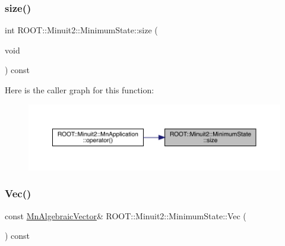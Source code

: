 \mbox{\label{classROOT_1_1Minuit2_1_1MinimumState_af680928a4485a4d0db0c81a8283d24bd}} 
\subsubsection{\texorpdfstring{size()}{size()}\hspace{0.1cm}{\footnotesize\ttfamily [2/2]}}
{\footnotesize\ttfamily int R\+O\+O\+T\+::\+Minuit2\+::\+Minimum\+State\+::size (\begin{DoxyParamCaption}\item[{void}]{ }\end{DoxyParamCaption}) const\hspace{0.3cm}{\ttfamily [inline]}}

Here is the caller graph for this function\+:\nopagebreak
\begin{figure}[H]
\begin{center}
\leavevmode
\includegraphics[width=350pt]{db/dcd/classROOT_1_1Minuit2_1_1MinimumState_af680928a4485a4d0db0c81a8283d24bd_icgraph}
\end{center}
\end{figure}
\mbox{\label{classROOT_1_1Minuit2_1_1MinimumState_a0c7ad9c9226473f87b1bbb15ed87bbcd}} 
\subsubsection{\texorpdfstring{Vec()}{Vec()}\hspace{0.1cm}{\footnotesize\ttfamily [1/2]}}
{\footnotesize\ttfamily const \mbox{\hyperlink{namespaceROOT_1_1Minuit2_a62ed97730a1ca8d3fbaec64a19aa11c9}{Mn\+Algebraic\+Vector}}\& R\+O\+O\+T\+::\+Minuit2\+::\+Minimum\+State\+::\+Vec (\begin{DoxyParamCaption}{ }\end{DoxyParamCaption}) const\hspace{0.3cm}{\ttfamily [inline]}}

